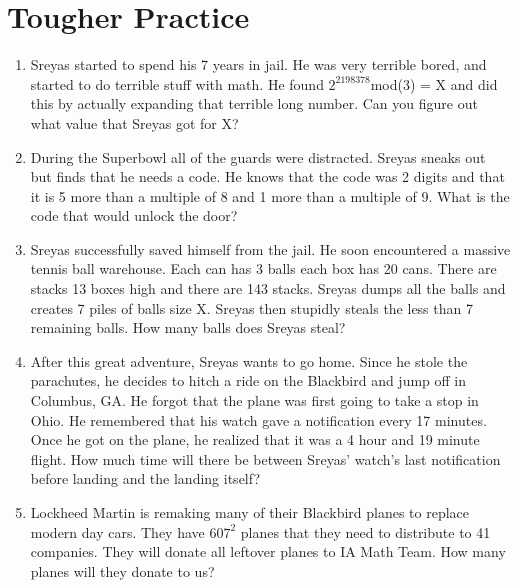 \documentclass[a4paper]{article}
\begin{document}
\section{Tougher Practice}
\begin{enumerate}[itemsep = 2.85cm]
    \item Sreyas started to spend his 7 years in jail. He was very terrible bored, and started to do terrible stuff with math. He found $2^{2198378}$mod(3) = X and did this by actually expanding that terrible long number. Can you figure out what value that Sreyas got for X?
    \item During the Superbowl all of the guards were distracted. Sreyas sneaks out but finds that he needs a code. He knows that the code was 2 digits and that it is 5 more than a multiple of 8 and 1 more than a multiple of 9. What is the code that would unlock the door?
    \item Sreyas successfully saved himself from the jail. He soon encountered a massive tennis ball warehouse. Each can has 3 balls each box has 20 cans. There are stacks 13 boxes high and there are 143 stacks. Sreyas dumps all the balls and creates 7 piles of balls size X.  Sreyas then stupidly steals the less than 7 remaining balls. How many balls does Sreyas steal?
    \item After this great adventure, Sreyas wants to go home. Since he stole the parachutes, he decides to hitch a ride on the Blackbird and jump off in Columbus, GA. He forgot that the plane was first going to take a stop in Ohio. He remembered that his watch gave a notification every 17 minutes. Once he got on the plane, he realized that it was a 4 hour and 19 minute flight. How much time will there be between Sreyas' watch's last notification before landing and the landing itself?
    \item Lockheed Martin is remaking many of their Blackbird planes to replace modern day cars. They have $607^2$ planes that they need to distribute to 41 companies. They will donate all leftover planes to IA Math Team. How many planes will they donate to us?
\end{enumerate}
\end{document}

